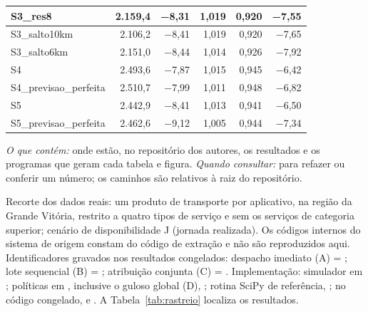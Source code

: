 \begin{table}[!htb]
\begin{tabular}{|l|r|r|r|r|r|}
\hline
S3\_res8 & 2.159,4 & −8,31 & 1,019 & 0,920 & −7,55 \\
\hline
S3\_salto10km & 2.106,2 & −8,41 & 1,019 & 0,920 & −7,65 \\
\hline
S3\_salto6km & 2.151,0 & −8,44 & 1,014 & 0,926 & −7,92 \\
\hline
S4 & 2.493,6 & −7,87 & 1,015 & 0,945 & −6,42 \\
\hline
S4\_previsao\_perfeita & 2.510,7 & −7,99 & 1,011 & 0,948 & −6,82 \\
\hline
S5 & 2.442,9 & −8,41 & 1,013 & 0,941 & −6,50 \\
\hline
S5\_previsao\_perfeita & 2.462,6 & −9,12 & 1,005 & 0,944 & −7,34 \\
\hline
\end{tabular}
\end{table}


\textit{O que contém:} onde estão, no repositório dos autores, os resultados e os programas que geram cada tabela e figura. \textit{Quando consultar:} para refazer ou conferir um número; os caminhos são relativos à raiz do repositório.

Recorte dos dados reais: um produto de transporte por aplicativo, na região da Grande Vitória, restrito a quatro tipos de serviço e sem os serviços de categoria superior; cenário de disponibilidade J (jornada realizada). Os códigos internos do sistema de origem constam do código de extração e não são reproduzidos aqui. Identificadores gravados nos resultados congelados: despacho imediato (A) = ; lote sequencial (B) = ; atribuição conjunta (C) = . Implementação: simulador em ; políticas em , inclusive o guloso global (D), ; rotina SciPy de referência, ; no código congelado,  e . A Tabela~\ref{tab:rastreio} localiza os resultados.

